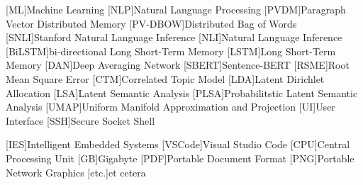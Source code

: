 \begin{acronym}[XXXXXXXXX]
    [ML]{Machine Learning}
    [NLP]{Natural Language Processing}
    [PVDM]{Paragraph Vector Distributed Memory}
    [PV-DBOW]{Distributed Bag of Words}
    [SNLI]{Stanford Natural Language Inference}
    [NLI]{Natural Language Inference}
    [BiLSTM]{bi-directional Long Short-Term Memory}
    [LSTM]{Long Short-Term Memory}
    [DAN]{Deep Averaging Network}
    [SBERT]{Sentence-BERT}
    [RSME]{Root Mean Square Error}
    [CTM]{Correlated Topic Model}
    [LDA]{Latent Dirichlet Allocation}
    [LSA]{Latent Semantic Analysis}
    [PLSA]{Probabilitstic Latent Semantic Analysis}
    [UMAP]{Uniform Manifold Approximation and Projection}
    [UI]{User Interface}
    [SSH]{Secure Socket Shell}


    \vspace{\parskip}
    [IES]{Intelligent Embedded Systems}
    [VSCode]{Visual Studio Code}
    [CPU]{Central Processing Unit}
    [GB]{Gigabyte}
    [PDF]{Portable Document Format}
    [PNG]{Portable Network Graphics}
    [etc.]{et cetera}

\end{acronym}
